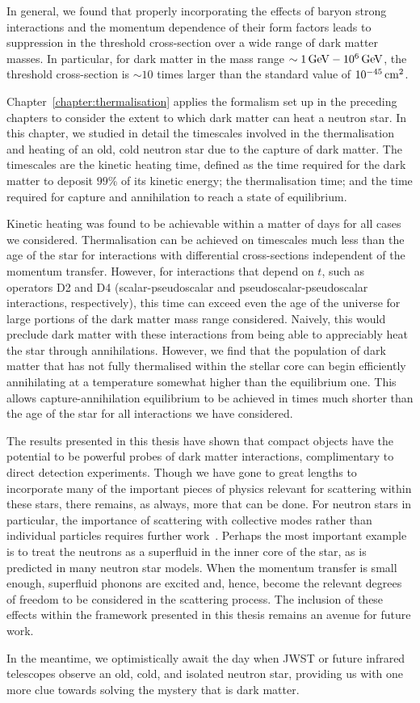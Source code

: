 In general, we found that properly incorporating the effects of baryon strong interactions and the momentum dependence of their form factors leads to suppression in the threshold cross-section over a wide range of dark matter masses. In particular, for dark matter in the mass range $\sim 1{\rm \,GeV}-10^6{\rm \,GeV}$, the threshold cross-section is $\sim 10$ times larger than the standard value of $10^{-45}{\rm \,cm}^2$. 

Chapter~\ref{chapter:thermalisation} applies the formalism set up in the preceding chapters to consider the extent to which dark matter can heat a neutron star. In this chapter, we studied in detail the timescales involved in the thermalisation and heating of an old, cold neutron star due to the capture of dark matter. The timescales are the kinetic heating time, defined as the time required for the dark matter to deposit $99\%$ of its kinetic energy; the thermalisation time; and the time required for capture and annihilation to reach a state of equilibrium. 

Kinetic heating was found to be achievable within a matter of days for all cases we considered. Thermalisation can be achieved on timescales much less than the age of the star for interactions with differential cross-sections independent of the momentum transfer. However, for interactions that depend on $t$, such as operators D2 and D4 (scalar-pseudoscalar and pseudoscalar-pseudoscalar interactions, respectively), this time can exceed even the age of the universe for large portions of the dark matter mass range considered. Naively, this would preclude dark matter with these interactions from being able to appreciably heat the star through annihilations.
However, we find that the population of dark matter that has not fully thermalised within the stellar core can begin efficiently annihilating at a temperature somewhat higher than the equilibrium one. This allows capture-annihilation equilibrium to be achieved in times much shorter than the age of the star for all interactions we have considered. 

The results presented in this thesis have shown that compact objects have the potential to be powerful probes of dark matter interactions, complimentary to direct detection experiments. Though we have gone to great lengths to incorporate many of the important pieces of physics relevant for scattering within these stars, there remains, as always, more that can be done. For neutron stars in particular, the importance of scattering with collective modes rather than individual particles requires further work~\cite{DeRocco:2022rze_may_Darkmatterscattering}. Perhaps the most important example is to treat the neutrons as a superfluid in the inner core of the star, as is predicted in many neutron star models. When the momentum transfer is small enough, superfluid phonons are excited and, hence, become the relevant degrees of freedom to be considered in the scattering process. The inclusion of these effects within the framework presented in this thesis remains an avenue for future work. 

In the meantime, we optimistically await the day when JWST or future infrared telescopes observe an old, cold, and isolated neutron star, providing us with one more clue towards solving the mystery that is dark matter.
